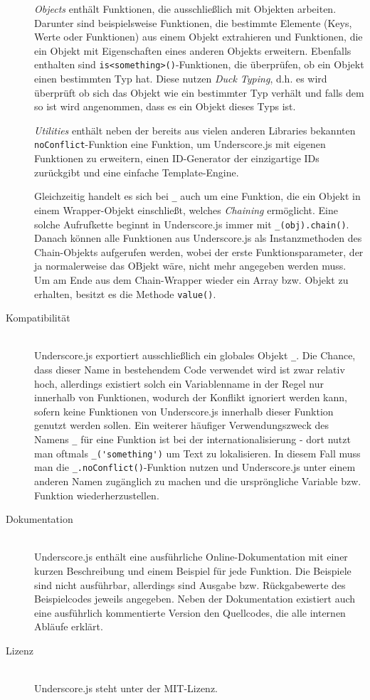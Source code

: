 \begin{description}
\emph{Objects} enthält Funktionen, die ausschließlich mit Objekten arbeiten. Darunter sind
beispielsweise Funktionen, die bestimmte Elemente (Keys, Werte oder Funktionen) aus einem Objekt
extrahieren und Funktionen, die ein Objekt mit Eigenschaften eines anderen Objekts erweitern.
Ebenfalls enthalten sind \lstinline{is<something>()}-Funktionen, die überprüfen, ob ein Objekt einen
bestimmten Typ hat. Diese nutzen \emph{Duck Typing}, d.h. es wird überprüft ob sich das Objekt wie
ein bestimmter Typ verhält und falls dem so ist wird angenommen, dass es ein Objekt dieses Typs ist.

\emph{Utilities} enthält neben der bereits aus vielen anderen Libraries bekannten
\lstinline{noConflict}-Funktion eine Funktion, um Underscore.js mit eigenen Funktionen zu erweitern,
einen ID-Generator der einzigartige IDs zurückgibt und eine einfache Template-Engine.

Gleichzeitig handelt es sich bei \lstinline{_} auch um eine Funktion, die ein Objekt in einem
Wrapper-Objekt einschließt, welches \emph{Chaining} ermöglicht. Eine solche Aufrufkette beginnt in
Underscore.js immer mit \lstinline{_(obj).chain()}. Danach können alle Funktionen aus Underscore.js
als Instanzmethoden des Chain-Objekts aufgerufen werden, wobei der erste Funktionsparameter, der ja
normalerweise das OBjekt wäre, nicht mehr angegeben werden muss. Um am Ende aus dem Chain-Wrapper
wieder ein Array bzw. Objekt zu erhalten, besitzt es die Methode \lstinline{value()}.

\item[Kompatibilität] \hfill \\
Underscore.js exportiert ausschließlich ein globales Objekt \lstinline{_}. Die Chance, dass dieser
Name in bestehendem Code verwendet wird ist zwar relativ hoch, allerdings existiert solch ein
Variablenname in der Regel nur innerhalb von Funktionen, wodurch der Konflikt ignoriert werden kann,
sofern keine Funktionen von Underscore.js innerhalb dieser Funktion genutzt werden sollen. Ein
weiterer häufiger Verwendungszweck des Namens \lstinline{_} für eine Funktion ist bei der
internationalisierung - dort nutzt man oftmals \lstinline{_('something')} um Text zu lokalisieren.
In diesem Fall muss man die \lstinline{_.noConflict()}-Funktion nutzen und Underscore.js unter einem
anderen Namen zugänglich zu machen und die urspröngliche Variable bzw. Funktion wiederherzustellen.

\item[Dokumentation] \hfill \\
Underscore.js enthält eine ausführliche Online-Dokumentation mit einer kurzen Beschreibung und einem
Beispiel für jede Funktion. Die Beispiele sind nicht ausführbar, allerdings sind Ausgabe bzw.
Rückgabewerte des Beispielcodes jeweils angegeben. Neben der Dokumentation existiert auch eine
ausführlich kommentierte Version den Quellcodes, die alle internen Abläufe erklärt.

\item[Lizenz] \hfill \\
Underscore.js steht unter der MIT-Lizenz.
\end{description}

